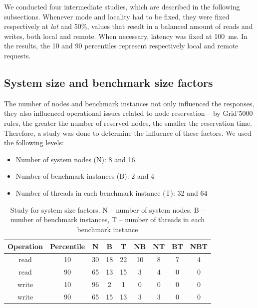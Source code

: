 \documentclass[man,floatsintext,12pt]{apa6}
\begin{document}
We conducted four intermediate studies, which are described in the following
subsections. Whenever mode and locality had to be fixed, they were fixed
respectively at \textit{lat} and 50\%, values that result in a balanced amount
of reads and writes, both local and remote. When necessary, latency was fixed
at 100~ms. In the results, the 10 and 90 percentiles represent respectively
local and remote requests.

\subsection{System size and benchmark size factors}

The number of nodes and benchmark instances not only influenced the
responses, they also influenced operational issues related to node reservation --
by Grid'5000 rules, the greater the number of reserved nodes, the smaller the
reservation time. Therefore, a study was done to determine the influence of
these factors. We used the following levels:

\begin{itemize}

\item Number of system nodes (N): 8 and 16

\item Number of benchmark instances (B): 2 and 4

\item Number of threads in each benchmark instance (T): 32 and 64

\end{itemize}

\begin{table}[h!]
  \caption{Study for system size factors. N -- number of system nodes, B --
number of benchmark instances, T -- number of threads in each benchmark
instance}
  \label{tab:estudo_para_fatores_de_tamanho_do_sistema}
  \begin{tabular}{ccccccccc}         \toprule
  Operation & Percentile & N & B & T & NB & NT & BT & NBT\\ \midrule
  
  read & 10 & 30 & 18 & 22 & 10 & 8 & 7 & 4 \\
  
  read & 90 & 65 & 13 & 15 & 3 & 4 & 0 & 0 \\
  
  write & 10 & 96 & 2 & 1 & 0 & 0 & 0 & 0 \\
  
  write & 90 & 65 & 15 & 13 & 3 & 3 & 0 & 0 \\ \bottomrule
  \end{tabular}
\end{table}
\end{document}
